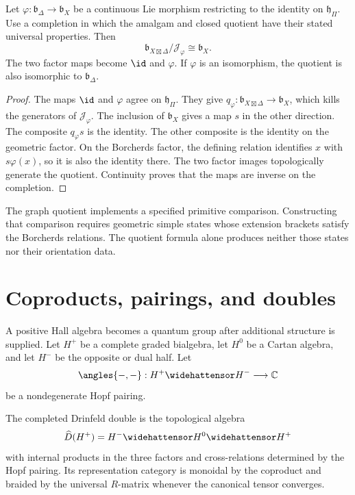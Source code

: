 \begin{proposition}\label{cyiv:graph-quotient}
Let $\varphi:\mathfrak b_\Delta\to\mathfrak b_X$ be a continuous Lie
morphism restricting to the identity on $\mathfrak h_\Pi$.
Use a completion in which the amalgam and closed quotient have
their stated universal properties.
Then
\[
 \mathfrak b_{X\boxtimes\Delta}/\mathcal J_\varphi
 \cong\mathfrak b_X.
\]
The two factor maps become $\id$ and $\varphi$.
If $\varphi$ is an isomorphism, the quotient is also isomorphic
to $\mathfrak b_\Delta$.
\end{proposition}
\begin{proof}
The maps $\id$ and $\varphi$ agree on $\mathfrak h_\Pi$.
They give $q_\varphi:\mathfrak b_{X\boxtimes\Delta}\to\mathfrak b_X$,
which kills the generators of $\mathcal J_\varphi$.
The inclusion of $\mathfrak b_X$ gives a map $s$ in the other direction.
The composite $q_\varphi s$ is the identity.
The other composite is the identity on the geometric factor.
On the Borcherds factor, the defining relation identifies $x$ with
$s\varphi(x)$, so it is also the identity there.
The two factor images topologically generate the quotient.
Continuity proves that the maps are inverse on the completion.
\end{proof}

The graph quotient implements a specified primitive comparison.
Constructing that comparison requires geometric simple states whose
extension brackets satisfy the Borcherds relations.
The quotient formula alone produces neither those states nor their
orientation data.

\chapter{Coproducts, pairings, and doubles}
A positive Hall algebra becomes a quantum group after additional structure is supplied. Let $H^+$ be a complete graded bialgebra, let $H^0$ be a Cartan algebra, and let $H^-$ be the opposite or dual half. Let
\[
 \angles{-,-}:H^+\widehattensor H^-\longrightarrow\kfield
\]
be a nondegenerate Hopf pairing.

\begin{definition}
The completed Drinfeld double is the topological algebra
\[
 \widehat D(H^+)=H^-\widehattensor H^0\widehattensor H^+
\]
with internal products in the three factors and cross-relations determined by the Hopf pairing. Its representation category is monoidal by the coproduct and braided by the universal $R$-matrix whenever the canonical tensor converges.
\end{definition}

